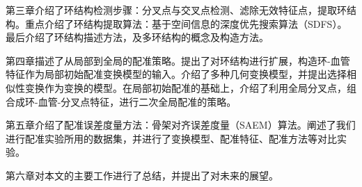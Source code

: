 第三章介绍了环结构检测步骤：分叉点与交叉点检测、滤除无效特征点，提取环结构。重点介绍了环结构提取算法：基于空间信息的深度优先搜索算法（SDFS）。最后介绍了环结构描述方法，及多环结构的概念及构造方法。
 
第四章描述了从局部到全局的配准策略。提出了对环结构进行扩展，构造环-血管特征作为局部初始配准变换模型的输入。介绍了多种几何变换模型，并提出选择相似性变换作为变换的模型。在局部初始配准的基础上，介绍了利用全局分叉点，组合成环-血管-分叉点特征，进行二次全局配准的策略。
 
第五章介绍了配准误差度量方法：骨架对齐误差度量（SAEM）算法。阐述了我们进行配准实验所用的数据集，并进行了变换模型、配准特征、配准方法等对比实验。
 
第六章对本文的主要工作进行了总结，并提出了对未来的展望。
